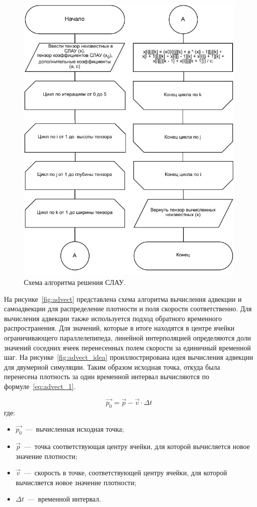 \begin{figure}[H]
	\centering
	\includegraphics[width=1.0\textwidth,page=1]{assets/img/gauss-zeidel.pdf}
	\caption{Схема алгоритма решения СЛАУ.}
	\label{fig:lin_solve}
\end{figure}

На рисунке~\ref{fig:advect} представлена схема алгоритма вычисления адвекции и самоадвекции для распределение плотности и поля скорости соответственно. Для вычисления адвекции также используется подход обратного временного распространения. Для значений, которые в итоге находятся в центре ячейки ограничивающего параллелепипеда, линейной интерполяцией определяются доли значений соседних ячеек перенесенных полем скорости за единичный временной шаг. На рисунке~\ref{fig:advect_idea} проиллюстрирована идея вычисления адвекции для двумерной симуляции. Таким образом исходная точка, откуда была перенесена плотность за один временной интервал вычисляются по формуле~\ref{eq:advect_1}. 

\begin{equation}
	\label{eq:advect_1}
	\vec{p_0} = \vec{p} - \vec{v} \cdot \Delta t
\end{equation}
где:
\begin{itemize}
	\item $\vec{p_0}$~---~вычисленная исходная точка;
	\item $\vec{p}$~---~точка соответствующая центру ячейки, для которой вычисляется новое значение плотности;
	\item $\vec{v}$~---~скорость в точке, соответствующей центру ячейки, для которой вычисляется новое значение плотности;
	\item $\Delta t$~---~временной интервал.
\end{itemize}

